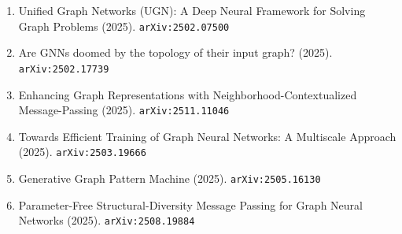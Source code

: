 \documentclass[11pt]{article}
\begin{document}
\begin{enumerate}
  \item Unified Graph Networks (UGN): A Deep Neural Framework for Solving Graph
  Problems (2025). \texttt{arXiv:2502.07500}
  \item Are GNNs doomed by the topology of their input graph? (2025). \texttt{arXiv:2502.17739}
  \item Enhancing Graph Representations with Neighborhood-Contextualized Message-Passing (2025). \texttt{arXiv:2511.11046}
  \item Towards Efficient Training of Graph Neural Networks: A Multiscale Approach (2025). \texttt{arXiv:2503.19666}
  \item Generative Graph Pattern Machine (2025). \texttt{arXiv:2505.16130}
  \item Parameter-Free Structural-Diversity Message Passing for Graph Neural Networks (2025). \texttt{arXiv:2508.19884}
\end{enumerate}
\end{document}

